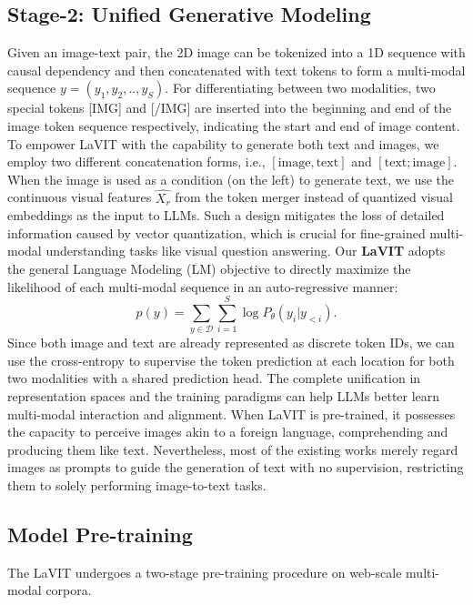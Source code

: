 \subsection{Stage-2: Unified Generative Modeling}
\label{sec:mllm}
Given an image-text pair, the 2D image can be tokenized into a 1D sequence with causal dependency and then concatenated with text tokens to form a multi-modal sequence $y=(y_1, y_2, .., y_S)$. For differentiating between two modalities, two special tokens [IMG] and [/IMG] are inserted into the beginning and end of the image token sequence respectively, indicating the start and end of image content. To empower LaVIT with the capability to generate both text and images, we employ two different concatenation forms, i.e., $[\text{image}, \text{text}]$ and $[\text{text};\text{image}]$. When the image is used as a condition (on the left) to generate text, we use the continuous visual features $\hat{X_r}$ from the token merger instead of quantized visual embeddings as the input to LLMs. Such a design mitigates the loss of detailed information caused by vector quantization, which is crucial for fine-grained multi-modal understanding tasks like visual question answering. Our \textbf{LaVIT} adopts the general Language Modeling (LM) objective to directly maximize the likelihood of each multi-modal sequence in an auto-regressive manner:
\begin{equation}
    p(y) = \sum_{y \in \mathcal{D}} \sum_{i=1}^{S} \log P_\theta(y_i | y_{< i}).
\end{equation}
Since both image and text are already represented as discrete token IDs, we can use the cross-entropy to supervise the token prediction at each location for both two modalities with a shared prediction head. The complete unification in representation spaces and the training paradigms can help LLMs better learn multi-modal interaction and alignment. When LaVIT is pre-trained, it possesses the capacity to perceive images akin to a foreign language, comprehending and producing them like text. Nevertheless, most of the existing works merely regard images as prompts to guide the generation of text with no supervision, restricting them to solely performing image-to-text tasks.

\vspace{-0.05in}

\subsection{Model Pre-training}
The LaVIT undergoes a two-stage pre-training procedure on web-scale multi-modal corpora. 


